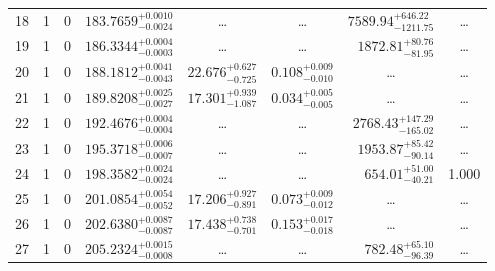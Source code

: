 \begin{table*}[!]
\begin{tabular}{llcrrlrc}
18 & 1 & 0 & $    183.7659_{-      0.0024}^{+      0.0010}$ & \multicolumn{1}{c}{\dots} & \multicolumn{1}{c}{\dots} & $     7589.94_{-     1211.75}^{+      646.22}$ & \dots \\[1pt]
19 & 1 & 0 & $    186.3344_{-      0.0003}^{+      0.0004}$ & \multicolumn{1}{c}{\dots} & \multicolumn{1}{c}{\dots} & $     1872.81_{-       81.95}^{+       80.76}$ & \dots \\[1pt]
20 & 1 & 0 & $    188.1812_{-      0.0043}^{+      0.0041}$ & $      22.676_{-       0.725}^{+       0.627}$ & $       0.108_{-       0.010}^{+       0.009}$ & \multicolumn{1}{c}{\dots} & \dots \\[1pt]
21 & 1 & 0 & $    189.8208_{-      0.0027}^{+      0.0025}$ & $      17.301_{-       1.087}^{+       0.939}$ & $       0.034_{-       0.005}^{+       0.005}$ & \multicolumn{1}{c}{\dots} & \dots \\[1pt]
22 & 1 & 0 & $    192.4676_{-      0.0004}^{+      0.0004}$ & \multicolumn{1}{c}{\dots} & \multicolumn{1}{c}{\dots} & $     2768.43_{-      165.02}^{+      147.29}$ & \dots \\[1pt]
23 & 1 & 0 & $    195.3718_{-      0.0007}^{+      0.0006}$ & \multicolumn{1}{c}{\dots} & \multicolumn{1}{c}{\dots} & $     1953.87_{-       90.14}^{+       85.42}$ & \dots \\[1pt]

24 & 1 & 0 & $    198.3582_{-      0.0024}^{+      0.0024}$ & \multicolumn{1}{c}{\dots} & \multicolumn{1}{c}{\dots} & $      654.01_{-       40.21}^{+       51.00}$ & 1.000\\[1pt]
25 & 1 & 0 & $    201.0854_{-      0.0052}^{+      0.0054}$ & $      17.206_{-       0.891}^{+       0.927}$ & $       0.073_{-       0.012}^{+       0.009}$ & \multicolumn{1}{c}{\dots} & \dots \\[1pt]
26 & 1 & 0 & $    202.6380_{-      0.0087}^{+      0.0087}$ & $      17.438_{-       0.701}^{+       0.738}$ & $       0.153_{-       0.018}^{+       0.017}$ & \multicolumn{1}{c}{\dots} & \dots \\[1pt]
27 & 1 & 0 & $    205.2324_{-      0.0008}^{+      0.0015}$ & \multicolumn{1}{c}{\dots} & \multicolumn{1}{c}{\dots} & $      782.48_{-       96.39}^{+       65.10}$ & \dots\\[1pt]


\end{tabular}
\end{table*}
